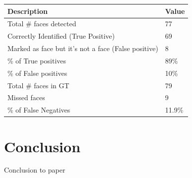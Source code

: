 \documentclass[
	submission,
	final,
	notitlepage,
	narroweqnarray,
	inline,
	twoside,
	]{ieee}
\begin{document}
\begin{table}[h!]
	\begin{tabular}{|p{6cm} | p{2cm}|}
		\hline
		{\bf Description} & {\bf Value}\\
		\hline
		\hline
		Total \# faces detected & 77\\
		Correctly Identified (True Positive) & 69 \\
		Marked as face but it's not a face (False positive) & 8 \\
		\% of True positives & 89\%\\
		\% of False positives & 10\%\\
		\hline
		Total \# faces in GT & 79\\
		Missed faces & 9\\
		\% of False Negatives & 11.9\%\\
		\hline
	\end{tabular}
\end{table}
\section{Conclusion}
\PARstart Conclusion to paper



\end{document}
